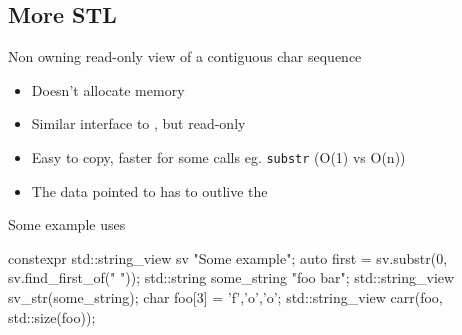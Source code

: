 \subsection[More]{More STL}

\begin{frame}[fragile]
  \begin{block}{Non owning read-only view of a contiguous char sequence}
    \begin{itemize}
    \item Doesn't allocate memory
    \item Similar interface to , but read-only
    \item Easy to copy, faster for some calls eg. \texttt{substr} (O(1) vs O(n))
    \item The data pointed to has to outlive the 
    \end{itemize}
  \end{block}
  \begin{exampleblock}{Some example uses}
    \begin{cppcode*}{}
      constexpr std::string_view sv {"Some example"};
      auto first = sv.substr(0, sv.find_first_of(" "));
      std::string some_string {"foo bar"};
      std::string_view sv_str(some_string);
      char foo[3] = {'f','o','o'};
      std::string_view carr(foo, std::size(foo));
    \end{cppcode*}
  \end{exampleblock}
\end{frame}

